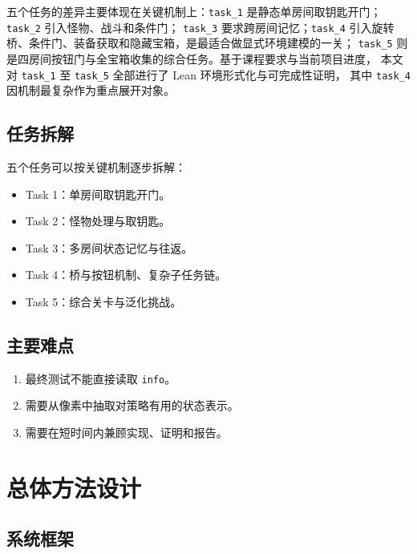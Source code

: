 \documentclass[12pt,a4paper]{ctexart}
\begin{document}
五个任务的差异主要体现在关键机制上：\texttt{task\_1}
是静态单房间取钥匙开门；\texttt{task\_2} 引入怪物、战斗和条件门；
\texttt{task\_3} 要求跨房间记忆；\texttt{task\_4}
引入旋转桥、条件门、装备获取和隐藏宝箱，是最适合做显式环境建模的一关；
\texttt{task\_5} 则是四房间按钮门与全宝箱收集的综合任务。基于课程要求与当前项目进度，
本文对 \texttt{task\_1} 至 \texttt{task\_5} 全部进行了 Lean 环境形式化与可完成性证明，
其中 \texttt{task\_4} 因机制最复杂作为重点展开对象。

\subsection{任务拆解}

五个任务可以按关键机制逐步拆解：
\begin{itemize}[leftmargin=2em]
  \item Task 1：单房间取钥匙开门。
  \item Task 2：怪物处理与取钥匙。
  \item Task 3：多房间状态记忆与往返。
  \item Task 4：桥与按钮机制、复杂子任务链。
  \item Task 5：综合关卡与泛化挑战。
\end{itemize}

\subsection{主要难点}

\begin{enumerate}[leftmargin=2em]
  \item 最终测试不能直接读取 \texttt{info}。
  \item 需要从像素中抽取对策略有用的状态表示。
  \item 需要在短时间内兼顾实现、证明和报告。
\end{enumerate}

\section{总体方法设计}

\subsection{系统框架}
\end{document}
